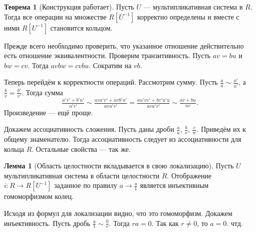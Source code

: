 \documentclass[10pt,a4paper,oneside]{book}
\theoremstyle{definition}
\newtheorem*{rem}{Замечание}
\newtheorem{thm}{Теорема}
\newtheorem{lem}{Лемма}
\def\thrm{\begin{thm}}
\def\ethrm{\end{thm}}
\def\lm{\begin{lem}}
\def\elm{\end{lem}}
\def\rm{\begin{rem}}
\def\erm{\end{rem}}
\begin{document}
\thrm[Конструкция работает] Пусть $U$ --- мультипликативная система в $R$. Тогда все операции на множестве $R[U^{-1}]$ корректно определены и вместе с ними $R[U^{-1}]$ становится кольцом.
\ethrm
\proof
Прежде всего необходимо проверить, что указанное отношение действительно есть отношение эквивалентности. Проверим транзитивность. Пусть $av=bu$ и $bw=cv$. Тогда $avbw=cvbu$. Сократим на $vb$. 

Теперь перейдём к корректности операций. Рассмотрим сумму. Пусть $\tfrac{a}{u}\sim \tfrac{a'}{u'}$, а  $\tfrac{b}{v}=\tfrac{b'}{v'}$. Тогда сумма 
$$\tfrac{a'v'+b'u'}{u'v'}\sim \tfrac{uva'v'+uvb'u'}{uvu'v'}= \tfrac{au'vv'+bv'u'u}{uvu'v'}\sim \tfrac{av+bu}{uv}.$$
Произведение --- ещё проще. 

Докажем ассоциативность сложения. Пусть даны дроби $\tfrac{a}{u}$, $\tfrac{b}{v}$, $\tfrac{c}{w}$. Приведём их к общему знаменателю. Тогда ассоциативность следует из ассоциативности для кольца $R$. Остальные свойства --- так же. 
\endproof



\lm[Область целостности вкладывается в свою локализацию] Пусть $U$ мультипликативная система в области целостности $R$. Отображение $i\colon R\to R[U^{-1}]$ заданное по правилу $a\to \tfrac{a}{1}$ является инъективным гомоморфизмом колец.
\elm
\proof Исходя из формул для локализации видно, что это гомоморфизм. Докажем инъективность. Пусть дробь $\tfrac{a}{1}\sim \tfrac{0}{r}$. Тогда $ra=0$. Так как $r\neq 0$, то $a=0$. чтд.
\endproof



\end{document}
